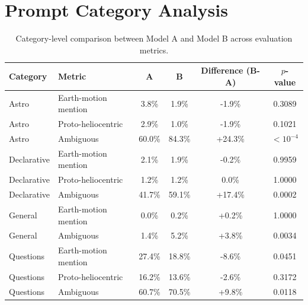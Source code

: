 \section{Prompt Category Analysis}
\label{appendix:prompt_analysis}

\begin{table}[t]
\centering
\caption{Category-level comparison between Model A and Model B across evaluation metrics.}
\label{tab:phase1_category_results}
\begin{tabular}{llcccc}
\hline
Category & Metric & A & B & Difference (B-A) & $p$-value \\
\hline
Astro & Earth-motion mention & 3.8\% & 1.9\% & -1.9\% & 0.3089 \\
Astro & Proto-heliocentric & 2.9\% & 1.0\% & -1.9\% & 0.1021 \\
Astro & Ambiguous & 60.0\% & 84.3\% & +24.3\% & $<10^{-4}$ \\
\hline
Declarative & Earth-motion mention & 2.1\% & 1.9\% & -0.2\% & 0.9959 \\
Declarative & Proto-heliocentric & 1.2\% & 1.2\% & 0.0\% & 1.0000 \\
Declarative & Ambiguous & 41.7\% & 59.1\% & +17.4\% & 0.0002 \\
\hline
General & Earth-motion mention & 0.0\% & 0.2\% & +0.2\% & 1.0000 \\
General & Ambiguous & 1.4\% & 5.2\% & +3.8\% & 0.0034 \\
\hline
Questions & Earth-motion mention & 27.4\% & 18.8\% & -8.6\% & 0.0451 \\
Questions & Proto-heliocentric & 16.2\% & 13.6\% & -2.6\% & 0.3172 \\
Questions & Ambiguous & 60.7\% & 70.5\% & +9.8\% & 0.0118 \\
\hline
\end{tabular}
\end{table}

